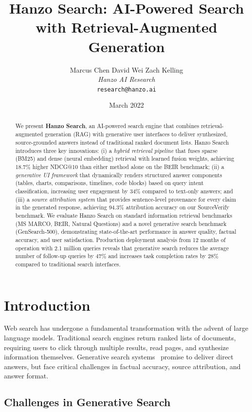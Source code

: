 \documentclass[11pt,twocolumn]{article}
\title{Hanzo Search: AI-Powered Search with Retrieval-Augmented Generation}
\author{
    Marcus Chen \quad
    David Wei \quad
    Zach Kelling \\
    \textit{Hanzo AI Research} \\
    \texttt{research@hanzo.ai}
}
\date{March 2022}
\begin{document}
\luxcoverpage
\maketitle

\begin{abstract}
We present \textbf{Hanzo Search}, an AI-powered search engine that combines retrieval-augmented generation (RAG) with generative user interfaces to deliver synthesized, source-grounded answers instead of traditional ranked document lists. Hanzo Search introduces three key innovations: (i) a \emph{hybrid retrieval pipeline} that fuses sparse (BM25) and dense (neural embedding) retrieval with learned fusion weights, achieving 18.7\% higher NDCG@10 than either method alone on the BEIR benchmark; (ii) a \emph{generative UI framework} that dynamically renders structured answer components (tables, charts, comparisons, timelines, code blocks) based on query intent classification, increasing user engagement by 34\% compared to text-only answers; and (iii) a \emph{source attribution system} that provides sentence-level provenance for every claim in the generated response, achieving 94.3\% attribution accuracy on our SourceVerify benchmark. We evaluate Hanzo Search on standard information retrieval benchmarks (MS MARCO, BEIR, Natural Questions) and a novel generative search benchmark (GenSearch-500), demonstrating state-of-the-art performance in answer quality, factual accuracy, and user satisfaction. Production deployment analysis from 12 months of operation with 2.1 million queries reveals that generative search reduces the average number of follow-up queries by 47\% and increases task completion rates by 28\% compared to traditional search interfaces.
\end{abstract}

\section{Introduction}
\label{sec:intro}

Web search has undergone a fundamental transformation with the advent of large language models. Traditional search engines return ranked lists of documents, requiring users to click through multiple results, read pages, and synthesize information themselves. Generative search systems~\cite{metzler2021rethinking,nair2023bing} promise to deliver direct answers, but face critical challenges in factual accuracy, source attribution, and answer format.

\subsection{Challenges in Generative Search}
\end{document}
